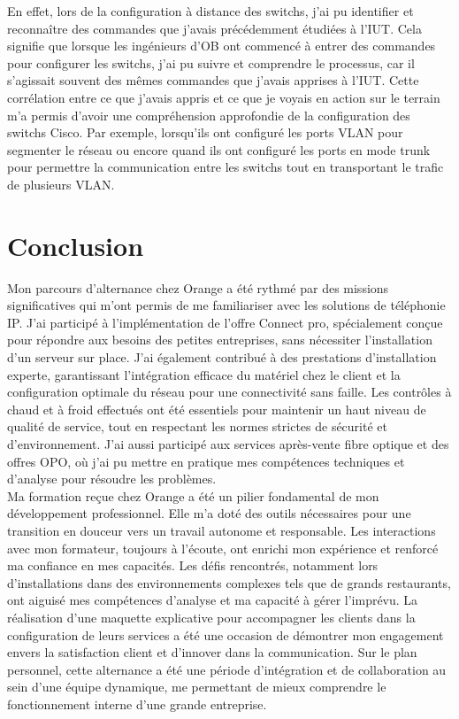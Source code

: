 \documentclass[12pt, a4paper]{article}
\begin{document}
En effet, lors de la configuration à distance des switchs,
j'ai pu identifier et reconnaître des commandes que j'avais
précédemment étudiées à l'IUT. Cela signifie que lorsque les
ingénieurs d'OB ont commencé à entrer des commandes pour
configurer les switchs, j'ai pu suivre et comprendre le processus,
car il s'agissait souvent des mêmes commandes que j'avais apprises à
l'IUT. Cette corrélation entre ce que j'avais appris et ce que
je voyais en action sur le terrain m'a permis d'avoir une
compréhension approfondie de la configuration des switchs Cisco.
Par exemple, lorsqu'ils ont configuré les ports VLAN
pour segmenter le réseau ou encore quand ils ont 
configuré les ports en mode trunk pour permettre
la communication entre les switchs tout en 
transportant le trafic de plusieurs VLAN.\\

\newpage
\section{Conclusion}
Mon parcours d'alternance chez Orange a été rythmé par des missions
significatives qui m'ont permis de me familiariser avec les solutions
de téléphonie IP. J'ai participé à
l'implémentation de l'offre Connect pro, spécialement conçue pour
répondre aux besoins des petites entreprises, sans nécessiter
l'installation d'un serveur sur place. J'ai également
contribué à des prestations d'installation experte, garantissant
l'intégration efficace du matériel chez le client et la configuration
optimale du réseau pour une connectivité sans faille. Les contrôles
à chaud et à froid effectués ont été essentiels pour maintenir un
haut niveau de qualité de service, tout en respectant les normes
strictes de sécurité et d'environnement. J'ai aussi participé
aux services après-vente fibre optique et des offres
OPO, où j'ai pu mettre en pratique mes
compétences techniques et d'analyse pour résoudre les problèmes.\\

Ma formation reçue chez Orange a été un pilier fondamental de mon
développement professionnel. Elle m'a doté des outils nécessaires
pour une transition en douceur vers un travail autonome et responsable.
Les interactions avec mon formateur, toujours à l'écoute, ont enrichi
mon expérience et renforcé ma confiance en mes capacités. Les défis
rencontrés, notamment lors d'installations 
dans des environnements complexes tels que de grands restaurants,
ont aiguisé mes compétences d'analyse et ma capacité à gérer l'imprévu.
La réalisation d'une maquette explicative pour accompagner les clients
dans la configuration de leurs services a été une occasion de démontrer
mon engagement envers la satisfaction client et d'innover dans la
communication. Sur le plan personnel, cette alternance a
été une période d'intégration et de collaboration au sein d'une équipe
dynamique, me permettant de mieux comprendre le fonctionnement interne
d'une grande entreprise.\\
\end{document}
